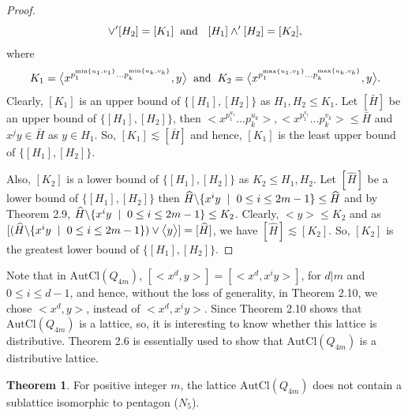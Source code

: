 \documentclass{article}
\theoremstyle{definition}
\newtheorem{theorem}{Theorem}[section]
\begin{document}
\begin{proof}
\begin{equation*}
            [H_1]\vee' [H_2]=[K_1] \hspace{0.2cm} \text{and }\hspace{0.2cm} [H_1]\wedge' [H_2]=[K_2], 
        \end{equation*}
        where \begin{equation*}
            K_1=\bigl<x^{p_1^{\min\{u_1,v_1\}}\dots p_k^{\min\{u_k,v_k\}}},y\bigr> \hspace{0.2cm} \text{and} \hspace{0.2cm} K_2=\bigl<x^{p_1^{\max\{u_1,v_1\}}\dots p_k^{\max\{u_k,v_k\}}},y\bigr>.
        \end{equation*}
        Clearly, $[K_1]$ is an upper bound of $\{[H_1],[H_2]\}$ as $H_1,H_2\le K_1$. Let $[\bar H]$ be an upper bound of $\{[H_1],[H_2]\}$, then $\bigl<x^{p_1^{u_1}}\dots p_k^{u_k}\bigr>,\bigl<x^{p_1^{v_1}}\dots p_k^{v_k}\bigr>\le \bar H$ and $x^jy\in \bar H$ as $y\in H_1$. So, $[K_1]\lesssim[\bar H]$ and hence, $[K_1]$ is the least upper bound of $\{[H_1],[H_2]\}$. \par
        Also, $[K_2]$ is a lower bound of $\{[H_1],[H_2]\}$ as $K_2\le H_1,H_2$. Let $[\widehat H]$ be a lower bound of $\{[H_1],[H_2]\}$ then $\widehat H \backslash \{x^iy\hspace{0.2cm }|\hspace{0.2cm}0\le i\le 2m-1\}\le \widehat H$ and by Theorem 2.9, $\widehat H \backslash \{x^iy\hspace{0.2cm }|\hspace{0.2cm}0\le i\le 2m-1\}\le K_2$. Clearly, $\bigl<y\bigr>\le K_2$ and as $[(\widehat H \backslash \{x^iy\hspace{0.2cm }|\hspace{0.2cm}0\le i\le 2m-1\})\vee \bigl<y\bigr>]=[\widehat H]$, we have $[\widehat H]\lesssim [K_2]$. So, $[K_2]$ is the greatest lower bound of $\{[H_1],[H_2]\}$.  
    \end{proof}
    Note that in $\text{AutCl}(Q_{4m})$, $[\bigl<x^d,y\bigr>]=[\bigl<x^d,x^iy\bigr>]$, for $d|m$ and $0\le i\le d-1$, and hence, without the loss of generality, in Theorem 2.10, we chose $\bigl<x^d,y\bigr>$, instead of $\bigl<x^d,x^iy\bigr>$. Since Theorem 2.10 shows that $\text{AutCl}(Q_{4m})$ is a lattice, so, it is interesting to know whether this lattice is distributive. Theorem 2.6 is essentially used to show that $\text{AutCl}(Q_{4m})$ is a distributive lattice.
    \begin{theorem}
        For positive integer $m$, the lattice $\text{AutCl}(Q_{4m})$ does not contain a sublattice isomorphic to pentagon ($N_5$).
    \end{theorem}
\end{document}
